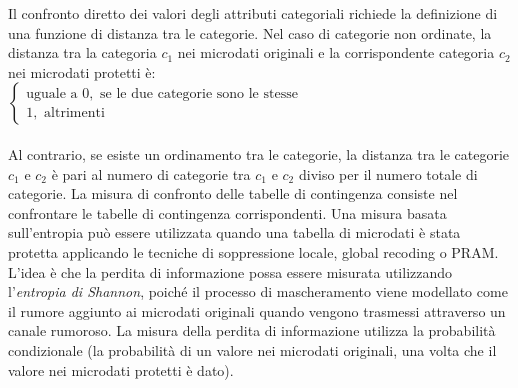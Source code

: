 Il confronto diretto dei valori degli attributi categoriali richiede la definizione di una funzione di distanza tra le categorie. Nel caso di categorie non ordinate, la distanza tra la categoria $c_1$ nei microdati originali e la corrispondente categoria $c_2$ nei microdati protetti è:
\\
$\begin{cases}
    \text{uguale a } 0, \text{ se le due categorie sono le stesse}\\
    1, \text{ altrimenti}
\end{cases}$
\\
\\Al contrario, se esiste un ordinamento tra le categorie, la distanza tra le categorie $c_1$ e $c_2$ è pari al numero di categorie tra $c_1$ e $c_2$ diviso per il numero totale di categorie. La misura di confronto delle tabelle di contingenza consiste nel confrontare le tabelle di contingenza corrispondenti. Una misura basata sull'entropia può essere utilizzata quando una tabella di microdati è stata protetta applicando le tecniche di soppressione locale, global recoding o PRAM. L'idea è che la perdita di informazione possa essere misurata utilizzando l'\textit{entropia di Shannon}, poiché il processo di mascheramento viene modellato come il rumore aggiunto ai microdati originali quando vengono trasmessi attraverso un canale rumoroso. La misura della perdita di informazione utilizza la probabilità condizionale (la probabilità di un valore nei microdati originali, una volta che il valore nei microdati protetti è dato).

